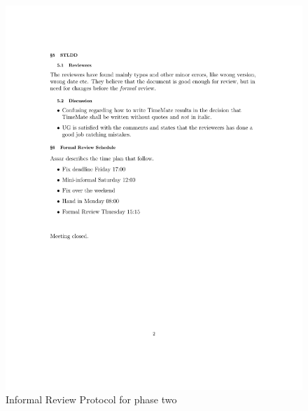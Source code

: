 \documentclass{article}
\begin{document}
 
 \begin{figure}
     \centering
     \includegraphics[width=13cm]{images/Phase2_2021_02_17-2}
     \renewcommand\figurename{Figure}
      \caption{Informal Review Protocol for phase two}
     \label{fig:my_label}
 \end{figure}
 
\end{document}
